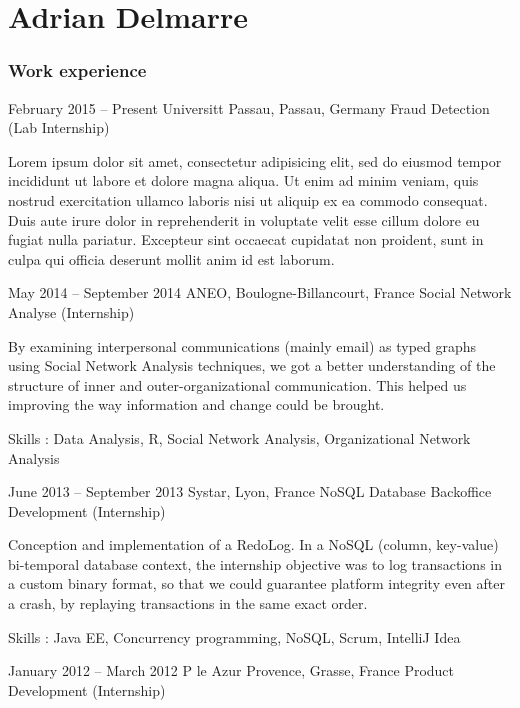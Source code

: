 \documentclass[fontsize=10pt]{tccv}
\begin{document}
\part{Adrian Delmarre}

\section{Work experience}

\begin{eventlist}

\item{February 2015 -- Present}
     {Universitt Passau, Passau, Germany}
     {Fraud Detection (Lab Internship)}

Lorem ipsum dolor sit amet, consectetur adipisicing elit, sed do eiusmod
tempor incididunt ut labore et dolore magna aliqua. Ut enim ad minim veniam,
quis nostrud exercitation ullamco laboris nisi ut aliquip ex ea commodo
consequat. Duis aute irure dolor in reprehenderit in voluptate velit esse
cillum dolore eu fugiat nulla pariatur. Excepteur sint occaecat cupidatat non
proident, sunt in culpa qui officia deserunt mollit anim id est laborum.

\item{May 2014 -- September 2014}
     {ANEO, Boulogne-Billancourt, France}
     {Social Network Analyse (Internship)}

By examining interpersonal communications (mainly email) as typed graphs using Social Network Analysis techniques, we got a better understanding of the structure of inner and outer-organizational communication. This helped us improving the way information and change could be brought.

Skills : Data Analysis, R, Social Network Analysis, Organizational Network Analysis

\item{June 2013 -- September 2013}
     {Systar, Lyon, France}
     {NoSQL Database Backoffice Development (Internship)}

Conception and implementation of a RedoLog.
In a NoSQL (column, key-value) bi-temporal database context, the internship objective was to log transactions in a custom binary format, so that we could guarantee platform integrity even after a crash, by replaying transactions in the same exact order.

Skills : Java EE, Concurrency programming, NoSQL, Scrum, IntelliJ Idea

\item{January 2012 -- March 2012}
     {P le Azur Provence, Grasse, France}
     {Product Development (Internship)}


\end{eventlist}
\end{document}
